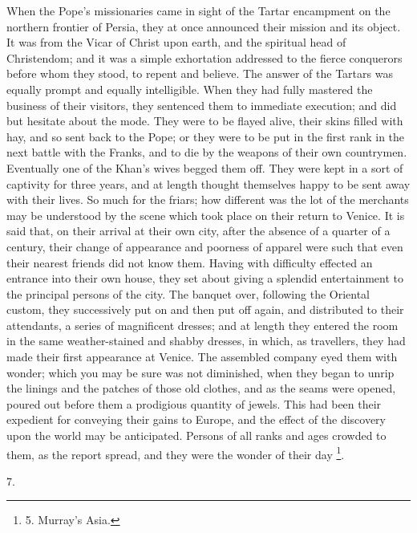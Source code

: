 When the Pope's missionaries
came in sight of the Tartar encampment on the northern frontier of
Persia, they at once announced their mission and its object. It was
from the Vicar of Christ upon earth, and the spiritual head of
Christendom; and it was a simple exhortation addressed to the fierce
conquerors before whom they stood, to repent and believe. The answer
of the Tartars was equally prompt and equally intelligible. When they
had fully mastered the business of their visitors, they sentenced them
to immediate execution; and did but hesitate about the mode. They were
to be flayed alive, their skins filled with hay, and so sent back to
the Pope; or they were to be put in the first rank in the next
battle with the Franks, and to die by the weapons of their own
countrymen. Eventually one of the Khan's wives begged them off. They
were kept in a sort of captivity for three years, and at length
thought themselves happy to be sent away with their lives. So much for
the friars; how different was the lot of the merchants may be
understood by the scene which took place on their return to Venice. It
is said that, on their arrival at their own city, after the absence of
a quarter of a century, their change of appearance and poorness of
apparel were such that even their nearest friends did not know them.
Having with difficulty effected an entrance into their own house, they
set about giving a splendid entertainment to the principal persons of
the city. The banquet over, following the Oriental custom, they
successively put on and then put off again, and distributed to their
attendants, a series of magnificent dresses; and at length they
entered the room in the same weather-stained and shabby dresses, in
which, as travellers, they had made their first appearance at Venice.
The assembled company eyed them with wonder; which you may be sure was
not diminished, when they began to unrip the linings and the patches
of those old clothes, and as the seams were opened, poured out before
them a prodigious quantity of jewels. This had been their expedient
for conveying their gains to Europe, and the effect of the discovery
upon the world may be anticipated. Persons of all ranks and ages
crowded to them, as the report spread, and they were the wonder of
their day \footnote{5.
Murray's Asia.}.

7.

